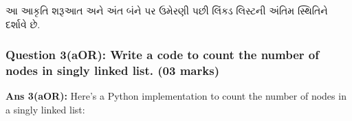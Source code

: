 આ આકૃતિ શરૂઆત અને અંત બંને પર ઉમેરણી પછી લિંક્ડ લિસ્ટની અંતિમ સ્થિતિને દર્શાવે છે.

\hypertarget{question-3aor-write-a-code-to-count-the-number-of-nodes-in-singly-linked-list.-03-marks}{%
\subsubsection{Question 3(aOR): Write a code to count the number of
nodes in singly linked list. (03
marks)}\label{question-3aor-write-a-code-to-count-the-number-of-nodes-in-singly-linked-list.-03-marks}}

\textbf{Ans 3(aOR):} Here's a Python implementation to count the number
of nodes in a singly linked list:

\begin{Shaded}
\begin{Highlighting}[]
     \NormalTok{(}
        \OperatorTok{=}
         \OperatorTok{=} 

     \NormalTok{(}\NormalTok{):}
        \OperatorTok{=} 

    \NormalTok{):}
\OperatorTok{=} 
\OperatorTok{=} 
\OperatorTok{+=} 
\OperatorTok{=}

\OperatorTok{=}
\OperatorTok{=}\NormalTok{)}
 \OperatorTok{=}\NormalTok{)}
 \OperatorTok{=}\NormalTok{)}

\NormalTok{(}
\end{Highlighting}
\end{Shaded}

